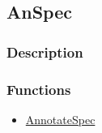 \subsection{AnSpec}\label{AnSpec}
\subsubsection{Description}

\subsubsection{Functions}
\begin{itemize}
\item \hyperref[AnnotateSpec]{AnnotateSpec}
\end{itemize}

